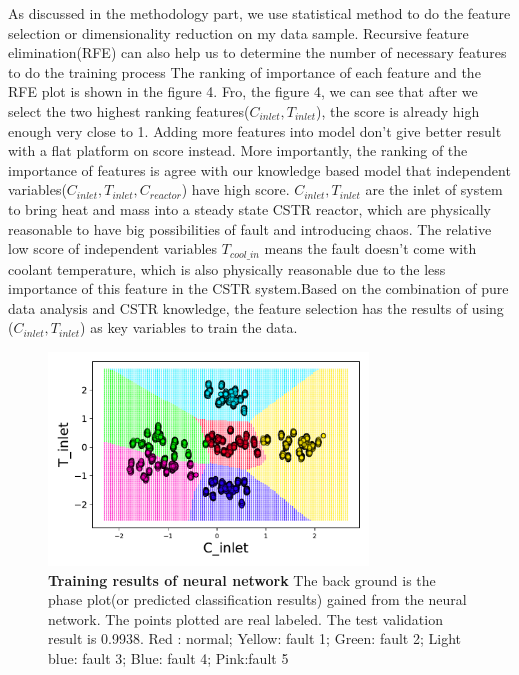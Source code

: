 \documentclass[fleqn,11pt]{wlscirep}
\begin{document}
 As discussed in the methodology part, we use statistical method to do the feature selection or dimensionality reduction on my data sample. Recursive feature elimination(RFE) can also help us to determine the number of necessary  features to do the training process  
 The ranking of importance of each feature and the RFE plot is shown in the figure 4. Fro, the figure 4, we can see that after we select the two highest ranking features($C_{inlet}, T_{inlet}$), the score is already high enough very close to 1. Adding more features into model don't give better result with a flat platform on score instead. More importantly, the ranking of the importance of features is agree with our knowledge based model  that independent variables($C_{inlet}, T_{inlet},C_{reactor} $) have high score. $C_{inlet}, T_{inlet}$ are the inlet of  system to bring heat and mass into a steady state CSTR reactor, which are physically reasonable to have big possibilities of fault and introducing chaos. The relative low score of independent variables $T_{cool\_in}$ means the fault doesn't come with coolant temperature, which is also physically reasonable due to the less importance of this feature in the CSTR system.Based on the combination of  pure data analysis  and CSTR knowledge, the feature selection has the results of using ($C_{inlet}, T_{inlet}$) as key variables to train the data.
\begin{figure}[h]
    \centering
    \includegraphics[width=8.5cm]{figure5.pdf}
    \caption{
    \textbf{Training results of neural network} The back ground is the phase plot(or predicted classification results) gained from the neural network. The points plotted are real labeled. The test validation result is 0.9938.  Red : normal; Yellow: fault 1; Green: fault 2; Light blue: fault 3;  Blue: fault 4; Pink:fault 5 }
    \label{fig:1}
\end{figure}
\end{document}
